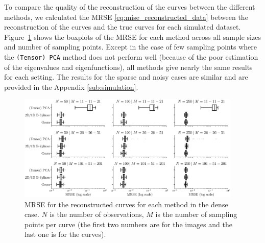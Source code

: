 \begin{results}
To compare the quality of the reconstruction of the curves between the different methods, we calculated the MRSE \eqref{eq:mise_reconstructed_data} between the reconstruction of the curves and the true curves for each simulated dataset. Figure~\ref{fig:mise_mfd_1d} shows the boxplots of the MRSE for each method across all sample sizes and number of sampling points. Except in the case of few sampling points where the \texttt{(Tensor) PCA} method does not perform well (because of the poor estimation of the eigenvalues and eigenfunctions), all methods give nearly the same results for each setting. The results for the sparse and noisy cases are similar and are provided in the Appendix \ref{sub:simulation}.
\begin{figure}
     \centering
     \includegraphics[width=0.95\textwidth]{MRSE}
    \caption{MRSE for the reconstructed curves for each method in the dense case. $N$ is the number of observations, $M$ is the number of sampling points per curve (the first two numbers are for the images and the last one is for the curves).}
    \label{fig:mise_mfd_1d}
\end{figure}
\end{results}




